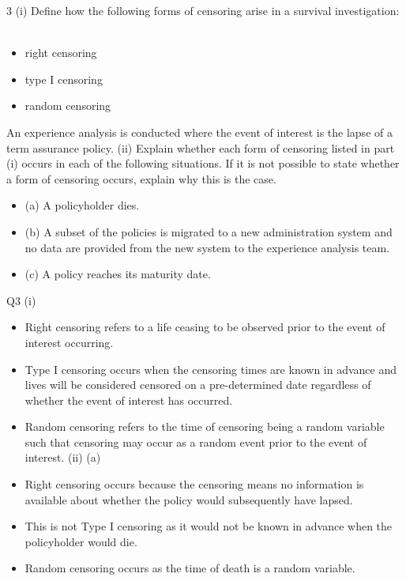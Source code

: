 \documentclass[a4paper,12pt]{article}
\begin{document}
3 (i)
Define how the following forms of censoring arise in a survival investigation:

\begin{itemize}
\item right censoring
\item type I censoring
\item random censoring
\end{itemize}

An experience analysis is conducted where the event of interest is the lapse of a term
assurance policy.
(ii)
Explain whether each form of censoring listed in part (i) occurs in each of the
following situations. If it is not possible to state whether a form of censoring
occurs, explain why this is the case.
\begin{itemize}
    \item (a) A policyholder dies.
    \item (b) A subset of the policies is migrated to a new administration system and
no data are provided from the new system to the experience analysis
team.
    \item (c) A policy reaches its maturity date.
\end{itemize}


Q3
(i)
\begin{itemize}
    \item Right censoring refers to a life ceasing to be observed prior to the event of
interest occurring.
\item Type I censoring occurs when the censoring times are known in advance and
lives will be considered censored on a pre-determined date regardless of
whether the event of interest has occurred.
\item Random censoring refers to the time of censoring being a random variable
such that censoring may occur as a random event prior to the event of interest.
(ii)
(a)
\item Right censoring occurs because the censoring means no information is
available about whether the policy would subsequently have lapsed.
\item This is not Type I censoring as it would not be known in advance when
the policyholder would die.
\item Random censoring occurs as the time of death is a random variable.
\end{itemize}
\end{document}
